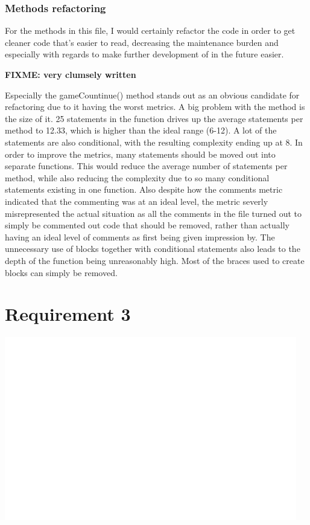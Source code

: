 \documentclass[UKenglish]{article}  %
\begin{document}
\subsubsection{Methods refactoring}
For the methods in this file, I would certainly refactor the code in order
to get cleaner code that's easier to read, decreasing the maintenance burden
and especially with regards to make further development of in the future
easier.

\textbf{FIXME: very clumsely written}

Especially the gameCountinue() method stands out as an obvious candidate for
refactoring due to it having the worst metrics.
A big problem with the method is the size of it. 25 statements in the function
drives up the average statements per method to 12.33, which is higher than the
ideal range (6-12).
A lot of the statements are also conditional, with the resulting complexity
ending up at 8.
In order to improve the metrics, many statements should be moved out into
separate functions. This would reduce the average number of statements per
method, while also reducing the complexity due to so many conditional
statements existing in one function.
Also despite how the comments metric indicated that the commenting was at an
ideal level, the metric severly misrepresented the actual situation as all
the comments in the file turned out to simply be commented out code that
should be removed, rather than actually having an ideal level of comments
as first being given impression by.
The unnecessary use of blocks together with conditional statements also leads
to the depth of the function being unreasonably high.
Most of the braces used to create blocks can simply be removed.

\section{Requirement 3}
\includegraphics[height=8cm]{project-metrics-summary-final.png}
\end{document}

